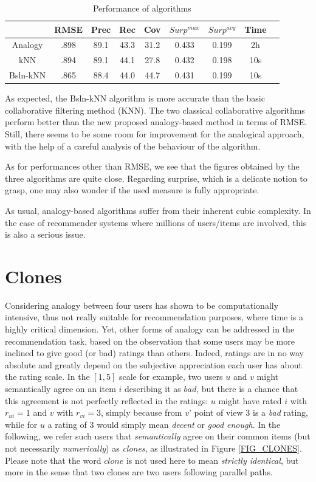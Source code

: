 \begin{table}[ht]
\begin{tabular}{| c || c | c | c | c | c | c | c | c |}
\hline
& RMSE & Prec & Rec & Cov & $Surp^{max}$ & $Surp^{avg}$ & Time \\
\hline
Analogy   & .898 & 89.1 & 43.3 & 31.2 & 0.433 & 0.199 & 2h \\
kNN     & .894 & 89.1 & 44.1 & 27.8 & 0.432 & 0.198 & 10s \\
Bsln-kNN & .865 & 88.4 & 44.0 & 44.7 & 0.431 & 0.199 & 10s \\
\hline
\end{tabular}

\caption{Performance of algorithms}
  \label{Zob}
\end{table}

As expected, the Bsln-kNN algorithm is more accurate than the basic
collaborative filtering method (KNN). The two classical collaborative
algorithms perform better than the new proposed analogy-based method in terms
of RMSE. Still, there seems to be some room for improvement for the analogical
approach, with the help of a careful analysis of the behaviour of the
algorithm.

As for performances other than RMSE, we see that the figures obtained by the
three algorithms are quite close. Regarding surprise, which is a delicate
notion to grasp, one may also wonder if the used measure is fully appropriate.

As usual, analogy-based algorithms suffer from their inherent cubic complexity.
In the case of recommender systems where millions of users/items are involved,
this is also a serious issue. 

\section{Clones}

Considering analogy between four users has shown to be computationally
intensive, thus not really suitable for recommendation purposes, where time is
a highly critical dimension. Yet, other forms of analogy can be addressed in
the recommendation task, based on the observation that some users may be more
inclined to give good (or bad) ratings than others. Indeed, ratings are in no
way absolute and greatly depend on the subjective appreciation each user has
about the rating scale. In the $[1, 5]$ scale for example, two users $u$ and
$v$ might semantically agree on an item $i$ describing it as $bad$, but there
is a chance that this agreement is not perfectly reflected in the ratings: $u$
might have rated $i$ with $r_{ui} = 1$ and $v$ with $r_{vi} = 3$, simply
because from $v$' point of view $3$ is a \textit{bad} rating, while for $u$ a
rating of $3$ would simply mean \textit{decent} or \textit{good enough}.  In
the following, we refer such users that \textit{semantically} agree on their
common items (but not necessarily \textit{numerically}) as \textit{clones}, as
illustrated in Figure \ref{FIG_CLONES}. Please note that the word $clone$ is
not used here to mean \textit{strictly identical}, but more in the sense that
two clones are two users following parallel paths.

